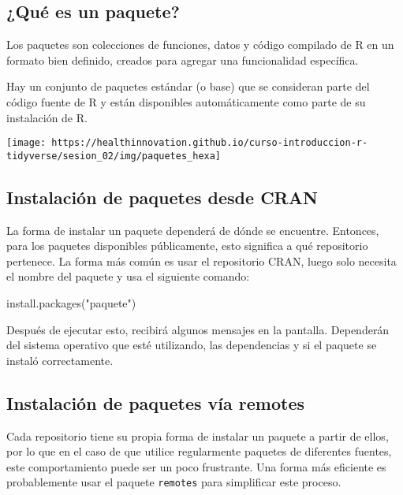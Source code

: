 \documentclass[
]{book}
\newenvironment{Shaded}{\begin{snugshade}}{\end{snugshade}}
\newcommand{\FunctionTok}[1]{\textcolor[rgb]{0.00,0.00,0.00}{#1}}
\newcommand{\NormalTok}[1]{#1}
\newcommand{\StringTok}[1]{\textcolor[rgb]{0.31,0.60,0.02}{#1}}
\begin{document}
\hypertarget{quuxe9-es-un-paquete}{%
\subsection{¿Qué es un paquete?}\label{quuxe9-es-un-paquete}}

Los paquetes son colecciones de funciones, datos y código compilado de R en un formato bien definido, creados para agregar una funcionalidad específica.

Hay un conjunto de paquetes estándar (o base) que se consideran parte del código fuente de R y están disponibles automáticamente como parte de su instalación de R.

\begin{center}\texttt{[image: https://healthinnovation.github.io/curso-introduccion-r-tidyverse/sesion\_02/img/paquetes\_hexa]} \end{center}

\hypertarget{instalaciuxf3n-de-paquetes-desde-cran}{%
\subsection{Instalación de paquetes desde CRAN}\label{instalaciuxf3n-de-paquetes-desde-cran}}

La forma de instalar un paquete dependerá de dónde se encuentre. Entonces, para los paquetes disponibles públicamente, esto significa a qué repositorio pertenece. La forma más común es usar el repositorio CRAN, luego solo necesita el nombre del paquete y usa el siguiente comando:

\begin{Shaded}
\begin{Highlighting}[]
\FunctionTok{install.packages}\NormalTok{(}\StringTok{"paquete"}\NormalTok{)}
\end{Highlighting}
\end{Shaded}

Después de ejecutar esto, recibirá algunos mensajes en la pantalla. Dependerán del sistema operativo que esté utilizando, las dependencias y si el paquete se instaló correctamente.

\hypertarget{instalaciuxf3n-de-paquetes-vuxeda-remotes}{%
\subsection{Instalación de paquetes vía remotes}\label{instalaciuxf3n-de-paquetes-vuxeda-remotes}}

Cada repositorio tiene su propia forma de instalar un paquete a partir de ellos, por lo que en el caso de que utilice regularmente paquetes de diferentes fuentes, este comportamiento puede ser un poco frustrante. Una forma más eficiente es probablemente usar el paquete \texttt{remotes} para simplificar este proceso.
\end{document}
